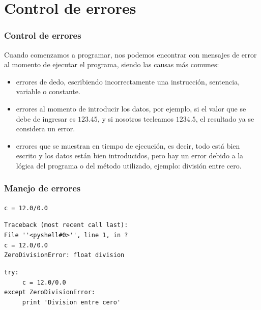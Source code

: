 \section{Control de errores}
\begin{frame}[fragile]
\frametitle{Control de errores}
Cuando comenzamos a programar, nos podemos encontrar con mensajes de error al momento de ejecutar el programa, siendo las causas más comunes:
\begin{itemize}[<+->]
\item errores de dedo, escribiendo incorrectamente una instrucción, sentencia, variable o constante.
\item errores al momento de introducir los datos, por ejemplo, si el valor que se debe de ingresar es $123.45$, y si nosotros tecleamos $1234.5$, el resultado ya se considera un error.
\item errores que se muestran en tiempo de ejecución, es decir, todo está bien escrito y los datos están bien introducidos, pero hay un error debido a la lógica del programa o del método utilizado, ejemplo: división entre cero.
\end{itemize}
\end{frame}
\begin{frame}[fragile]
\frametitle{Manejo de errores}
\verb|c = 12.0/0.0| \\
\pause
\begin{exampleblock}{}
\verb|Traceback (most recent call last):| \\
\verb|File ''<pyshell#0>'', line 1, in ?| \\
\verb|c = 12.0/0.0| \\
\verb|ZeroDivisionError: float division|
\end{exampleblock}
\pause
\begin{exampleblock}{}
\verb|try:| \\
\verb|     c = 12.0/0.0| \\
\verb|except ZeroDivisionError:| \\
\verb|     print 'Division entre cero'|
\end{exampleblock}
\end{frame}
